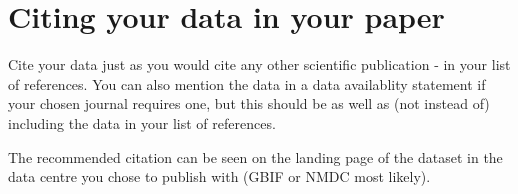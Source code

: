 \documentclass[a4paper,english, 11pt]{article}
\begin{document}
\section{Citing your data in your paper}
\label{s:citing}

Cite your data just as you would cite any other scientific publication - in your list of references. You can also mention the data in a data availablity statement if your chosen journal requires one, but this should be as well as (not instead of) including the data in your list of references.

The recommended citation can be seen on the landing page of the dataset in the data centre you chose to publish with (GBIF or NMDC most likely).
\end{document}
